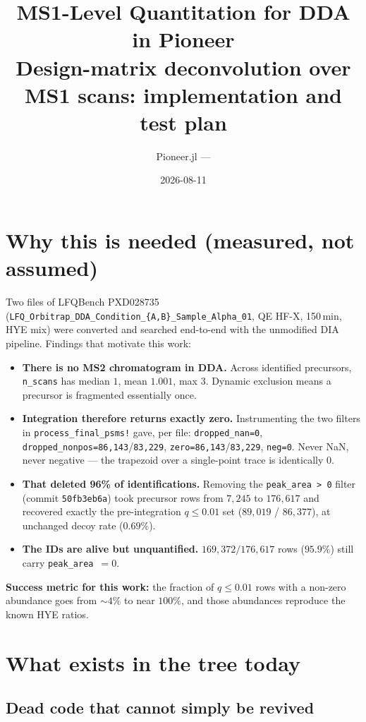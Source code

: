 \documentclass[11pt]{article}
\title{\bf MS1-Level Quantitation for DDA in Pioneer\\[2pt]
\large Design-matrix deconvolution over MS1 scans: implementation and test plan}
\author{Pioneer.jl --- \code{feat/dda-ms1-quant}}
\date{2026-08-11}
\newcommand{\code}[1]{\texttt{\small #1}}
\begin{document}
\maketitle

\section{Why this is needed (measured, not assumed)}

Two files of LFQBench PXD028735 (\code{LFQ\_Orbitrap\_DDA\_Condition\_\{A,B\}\_Sample\_Alpha\_01},
QE HF-X, 150\,min, HYE mix) were converted and searched end-to-end with the
unmodified DIA pipeline. Findings that motivate this work:

\begin{itemize}[nosep]
  \item \textbf{There is no MS2 chromatogram in DDA.} Across identified precursors,
        \code{n\_scans} has median $1$, mean $1.001$, max $3$. Dynamic exclusion means a
        precursor is fragmented essentially once.
  \item \textbf{Integration therefore returns exactly zero.} Instrumenting the two filters in
        \code{process\_final\_psms!} gave, per file:
        \code{dropped\_nan=0}, \code{dropped\_nonpos=86{,}143}/\code{83{,}229},
        \code{zero=86{,}143}/\code{83{,}229}, \code{neg=0}. Never NaN, never negative ---
        the trapezoid over a single-point trace is identically $0$.
  \item \textbf{That deleted 96\% of identifications.} Removing the \code{peak\_area > 0}
        filter (commit \code{50fb3eb6a}) took precursor rows from $7{,}245$ to $176{,}617$
        and recovered exactly the pre-integration $q\le0.01$ set ($89{,}019$ / $86{,}377$),
        at unchanged decoy rate ($0.69\%$).
  \item \textbf{The IDs are alive but unquantified.} $169{,}372/176{,}617$ rows
        ($95.9\%$) still carry \code{peak\_area}~$=0$.
\end{itemize}

\noindent\textbf{Success metric for this work:} the fraction of $q\le0.01$ rows with a
non-zero abundance goes from $\sim4\%$ to near $100\%$, and those abundances reproduce
the known HYE ratios.

\section{What exists in the tree today}

\subsection{Dead code that cannot simply be revived}
\end{document}
